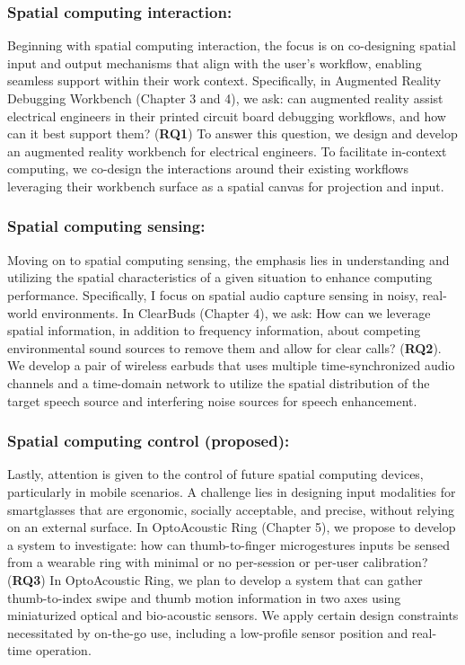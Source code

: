 \documentclass [11pt, proquest] {uwthesis}[2020/02/24]
\begin{document}
\subsubsection{Spatial computing interaction:} Beginning with spatial computing interaction, the focus is on co-designing spatial input and output mechanisms that align with the user's workflow, enabling seamless support within their work context. Specifically, in Augmented Reality Debugging Workbench (Chapter 3 and 4), we ask: can augmented reality assist electrical engineers in their printed circuit board debugging workflows, and how can it best support them? (\textbf{RQ1}) To answer this question, we design and develop an augmented reality workbench for electrical engineers. To facilitate in-context computing, we co-design the interactions around their existing workflows leveraging their workbench surface as a spatial canvas for projection and input.

\subsubsection{Spatial computing sensing:} Moving on to spatial computing sensing, the emphasis lies in understanding and utilizing the spatial characteristics of a given situation to enhance computing performance. Specifically, I focus on spatial audio capture sensing in noisy, real-world environments. In ClearBuds (Chapter 4), we ask: How can we leverage spatial information, in addition to frequency information, about competing environmental sound sources to remove them and allow for clear calls? (\textbf{RQ2}). We develop a pair of wireless earbuds that uses multiple time-synchronized audio channels and a time-domain network to utilize the spatial distribution of the target speech source and interfering noise sources for speech enhancement.

\subsubsection{Spatial computing control (proposed):} Lastly, attention is given to the control of future spatial computing devices, particularly in mobile scenarios. A challenge lies in designing input modalities for smartglasses that are ergonomic, socially acceptable, and precise, without relying on an external surface. In OptoAcoustic Ring (Chapter 5), we propose to develop a system to investigate: how can thumb-to-finger microgestures inputs be sensed from a wearable ring with minimal or no per-session or per-user calibration? (\textbf{RQ3}) In OptoAcoustic Ring, we plan to develop a system that can gather thumb-to-index swipe and thumb motion information in two axes using miniaturized optical and bio-acoustic sensors. We apply certain design constraints necessitated by on-the-go use, including a low-profile sensor position and real-time operation. 
\end{document}
